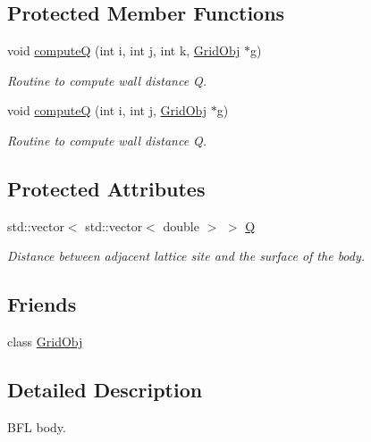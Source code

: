 \subsection*{Protected Member Functions}
\begin{DoxyCompactItemize}
\item 
void \hyperlink{class_b_f_l_body_a4b85b779da9755b508dab3130b8c1843}{computeQ} (int i, int j, int k, \hyperlink{class_grid_obj}{Grid\+Obj} $\ast$g)
\begin{DoxyCompactList}\small\item\em Routine to compute wall distance Q. \end{DoxyCompactList}\item 
void \hyperlink{class_b_f_l_body_a6ed2553f1a73ad34b00474b5c2ebee0c}{computeQ} (int i, int j, \hyperlink{class_grid_obj}{Grid\+Obj} $\ast$g)
\begin{DoxyCompactList}\small\item\em Routine to compute wall distance Q. \end{DoxyCompactList}\end{DoxyCompactItemize}
\subsection*{Protected Attributes}
\begin{DoxyCompactItemize}
\item 
std\+::vector$<$ std\+::vector$<$ double $>$ $>$ \hyperlink{class_b_f_l_body_a77b97a6b61e16616ab718c56c3a34622}{Q}
\begin{DoxyCompactList}\small\item\em Distance between adjacent lattice site and the surface of the body. \end{DoxyCompactList}\end{DoxyCompactItemize}
\subsection*{Friends}
\begin{DoxyCompactItemize}
\item 
class \hyperlink{class_b_f_l_body_a55cfec1721fb1b9d9e7592bd6288c998}{Grid\+Obj}
\end{DoxyCompactItemize}


\subsection{Detailed Description}
B\+FL body. 

